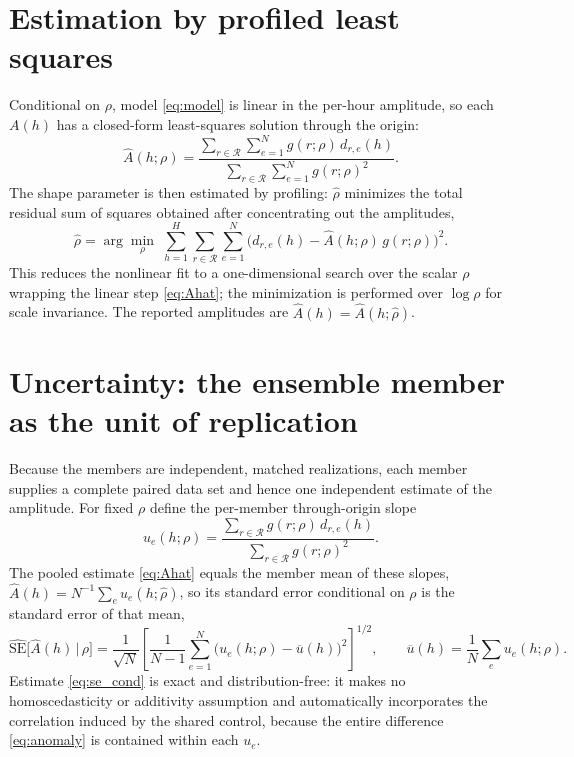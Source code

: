 \documentclass[11pt]{article}
\begin{document}
\section{Estimation by profiled least squares}

Conditional on $\rho$, model \eqref{eq:model} is linear in the per-hour amplitude,
so each $A(h)$ has a closed-form least-squares solution through the origin:
\begin{equation}
  \widehat{A}(h;\rho)
  = \frac{\sum_{r\in\mathcal{R}}\sum_{e=1}^{N} g(r;\rho)\, d_{r,e}(h)}
         {\sum_{r\in\mathcal{R}}\sum_{e=1}^{N} g(r;\rho)^2}.
  \label{eq:Ahat}
\end{equation}
The shape parameter is then estimated by profiling: $\widehat{\rho}$ minimizes the
total residual sum of squares obtained after concentrating out the amplitudes,
\begin{equation}
  \widehat{\rho}
  = \arg\min_{\rho}\;
    \sum_{h=1}^{H}\sum_{r\in\mathcal{R}}\sum_{e=1}^{N}
    \Big( d_{r,e}(h) - \widehat{A}(h;\rho)\, g(r;\rho) \Big)^2 .
  \label{eq:profile}
\end{equation}
This reduces the nonlinear fit to a one-dimensional search over the scalar $\rho$
wrapping the linear step \eqref{eq:Ahat}; the minimization is performed over
$\log\rho$ for scale invariance. The reported amplitudes are
$\widehat{A}(h) = \widehat{A}(h;\widehat{\rho})$.

\section{Uncertainty: the ensemble member as the unit of replication}
\label{sec:uncertainty}

Because the members are independent, matched realizations, each member supplies a
complete paired data set and hence one independent estimate of the amplitude. For
fixed $\rho$ define the per-member through-origin slope
\begin{equation}
  u_e(h;\rho)
  = \frac{\sum_{r\in\mathcal{R}} g(r;\rho)\, d_{r,e}(h)}
         {\sum_{r\in\mathcal{R}} g(r;\rho)^2}.
\end{equation}
The pooled estimate \eqref{eq:Ahat} equals the member mean of these slopes,
$\widehat{A}(h) = N^{-1}\sum_e u_e(h;\widehat{\rho})$, so its standard error
conditional on $\rho$ is the standard error of that mean,
\begin{equation}
  \widehat{\mathrm{SE}}\big[\widehat{A}(h)\,\big|\,\rho\big]
  = \frac{1}{\sqrt{N}}
    \left[\frac{1}{N-1}\sum_{e=1}^{N}\big(u_e(h;\rho)-\overline{u}(h)\big)^2\right]^{1/2},
  \qquad \overline{u}(h)=\frac{1}{N}\sum_{e} u_e(h;\rho).
  \label{eq:se_cond}
\end{equation}
Estimate \eqref{eq:se_cond} is exact and distribution-free: it makes no
homoscedasticity or additivity assumption and automatically incorporates the
correlation induced by the shared control, because the entire difference
\eqref{eq:anomaly} is contained within each $u_e$.
\end{document}
